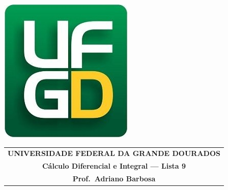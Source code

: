 \documentclass[a4paper,5pt]{amsbook}
\begin{document}
\thispagestyle{empty}
\pagestyle{empty}
\begin{minipage}[h]{0.14\textwidth}
	\includegraphics[scale=0.24]{../../ufgd.png}
\end{minipage}
\begin{minipage}[h]{\textwidth}
\begin{tabular}{c}
{{\bf UNIVERSIDADE FEDERAL DA GRANDE DOURADOS}}\\
{{\bf C\'alculo Diferencial e Integral --- Lista 9}}\\
{{\bf Prof.\ Adriano Barbosa}}\\
\end{tabular}
\vspace{-0.45cm}
%
\end{minipage}

\end{document}
